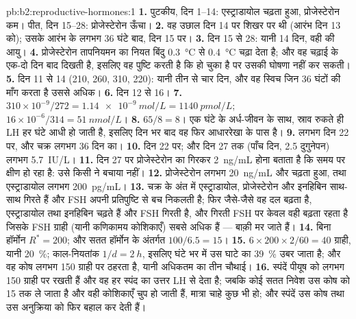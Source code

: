 \begin{solution}{pb:b2:reproductive-hormones:1}
\textbf{1.} पुटकीय, दिन 1--14: एस्ट्राडायोल चढ़ता हुआ, प्रोजेस्टेरोन
कम। पीत, दिन 15--28: प्रोजेस्टेरोन ऊँचा।
\textbf{2.} वह उछाल दिन 14 पर शिखर पर थी (आरंभ दिन 13 को);
 उसके आरंभ के लगभग 36 घंटे बाद, दिन 15 पर।
\textbf{3.} दिन 15 से 28: यानी 14 दिन, वही  की
आयु।
\textbf{4.} प्रोजेस्टेरोन तापनियमन का नियत बिंदु
\qty{0.3}{\celsius} से \qty{0.4}{\celsius} चढ़ा देता है; और वह चढ़ाई
 के एक-दो दिन बाद दिखती है, इसलिए वह पुष्टि करती है कि
 हो चुका है पर उसकी घोषणा नहीं कर सकती।
\textbf{5.} दिन 11 से 14 (210, 260, 310, 220): यानी तीन से चार दिन,
और वह स्विच जिन 36 घंटों की माँग करता है उससे अधिक।
\textbf{6.} दिन 12 से 16।
\textbf{7.} $310\times 10^{-9}/272 = \qty{1.14e-9}{mol/L} =
\qty{1140}{pmol/L}$; $16\times 10^{-6}/314 = \qty{51}{nmol/L}$।
\textbf{8.} $65/8 = 8$। एक घंटे के अर्ध-जीवन के साथ, स्राव रुकते ही LH
हर घंटे आधी हो जाती है, इसलिए दिन भर बाद वह फिर आधाररेखा के पास है।
\textbf{9.}  लगभग दिन 22 पर, और चक्र लगभग 36 दिन का।
\textbf{10.}  दिन 22 पर; और दिन 27 तक (पाँच दिन, 2.5
दुगुनेपन) लगभग \qty{5.7}{IU/L}।
\textbf{11.} दिन 27 पर प्रोजेस्टेरोन का गिरकर \qty{2}{ng/mL} होना
बताता है कि  समय पर क्षीण हो रहा है: उसे किसी ने बचाया नहीं।
\textbf{12.} प्रोजेस्टेरोन लगभग \qty{20}{ng/mL} और चढ़ता हुआ, तथा
एस्ट्राडायोल लगभग \qty{200}{pg/mL}।
\textbf{13.} चक्र के अंत में एस्ट्राडायोल, प्रोजेस्टेरोन और
इनहिबिन साथ-साथ गिरते हैं और FSH अपनी प्रतिपुष्टि से बच निकलती है; फिर
जैसे-जैसे वह दल बढ़ता है, एस्ट्राडायोल तथा इनहिबिन चढ़ते हैं और FSH
गिरती है, और गिरती FSH पर केवल वही  बढ़ता रहता है जिसके FSH ग्राही
(यानी कणिकामय कोशिकाएँ) सबसे अधिक हैं --- बाक़ी मर जाते हैं।
\textbf{14.} बिना हॉर्मोन $R^* = 200$; और सतत हॉर्मोन के अंतर्गत
$100/6.5 = 15$।
\textbf{15.} $6\times 200\times 2/60 = 40$ ग्राही, यानी \qty{20}{\%};
काल-नियतांक $1/d = \qty{2}{h}$, इसलिए घंटे भर में उस घाटे का \qty{39}{\%}
उबर जाता है; और वह कोष लगभग 150 ग्राही पर ठहरता है, यानी अधिकतम का तीन
चौथाई।
\textbf{16.} स्पंदें पीयूष को लगभग 150 ग्राही पर रखती हैं और वह
हर स्पंद का उत्तर LH से देता है; जबकि कोई सतत निवेश उस कोष को
15 तक ले जाता है और वही कोशिकाएँ चुप हो जाती हैं, मात्रा चाहे कुछ भी हो;
और स्पंदें उस कोष तथा उस अनुक्रिया को फिर बहाल कर देती हैं।

\end{solution}
